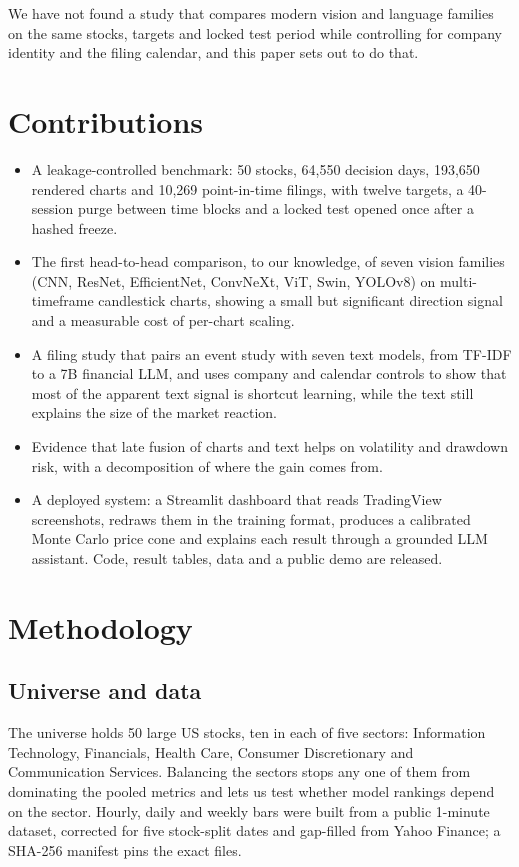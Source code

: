 \documentclass[conference]{IEEEtran}
\begin{document}
We have not found a study that compares modern vision and language families on the same stocks, targets and locked test period while controlling for company identity and the filing calendar, and this paper sets out to do that.

\section{Contributions}

\begin{itemize}
\item A leakage-controlled benchmark: 50 stocks, 64,550 decision days, 193,650 rendered charts and 10,269 point-in-time filings, with twelve targets, a 40-session purge between time blocks and a locked test opened once after a hashed freeze.
\item The first head-to-head comparison, to our knowledge, of seven vision families (CNN, ResNet, EfficientNet, ConvNeXt, ViT, Swin, YOLOv8) on multi-timeframe candlestick charts, showing a small but significant direction signal and a measurable cost of per-chart scaling.
\item A filing study that pairs an event study with seven text models, from TF-IDF to a 7B financial LLM, and uses company and calendar controls to show that most of the apparent text signal is shortcut learning, while the text still explains the size of the market reaction.
\item Evidence that late fusion of charts and text helps on volatility and drawdown risk, with a decomposition of where the gain comes from.
\item A deployed system: a Streamlit dashboard that reads TradingView screenshots, redraws them in the training format, produces a calibrated Monte Carlo price cone and explains each result through a grounded LLM assistant. Code, result tables, data and a public demo are released.
\end{itemize}

\section{Methodology}

\subsection{Universe and data}

The universe holds 50 large US stocks, ten in each of five sectors: Information Technology, Financials, Health Care, Consumer Discretionary and Communication Services. Balancing the sectors stops any one of them from dominating the pooled metrics and lets us test whether model rankings depend on the sector. Hourly, daily and weekly bars were built from a public 1-minute dataset, corrected for five stock-split dates and gap-filled from Yahoo Finance; a SHA-256 manifest pins the exact files.
\end{document}
